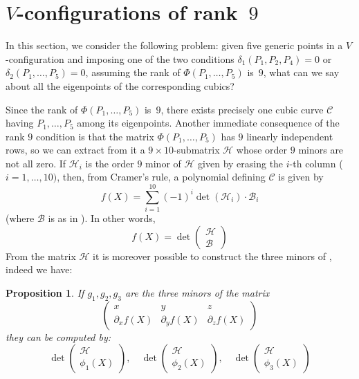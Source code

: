 \documentclass{amsart}
\theoremstyle{plain}
\newtheorem{prop}[lemma]{Proposition}
\theoremstyle{definition}
\newcommand{\de}{\partial}
\newcommand{\cbc}{\ensuremath{\mathcal{C}}}
\begin{document}
\section{$V$-configurations of rank~$9$}
\label{rank_9}

In this section, we consider the following problem:
given five generic points in a $V$-configuration and imposing one
of the two conditions
$\delta_1(P_1, P_2, P_4) = 0$ or $\delta_2(P_1, \dots, P_5) = 0$, assuming the rank of $\Phi(P_1, \dots, P_5)$ is~$9$, what can we say about all the eigenpoints of the corresponding cubics?

Since the rank of $\Phi(P_1, \dots, P_5)$ is~$9$, there exists precisely one cubic curve $\cbc$ having $P_1, \dots, P_5$ among its eigenpoints. Another immediate consequence of the rank $9$ condition is that the
matrix $\Phi(P_1, \dots, P_5)$ has $9$ linearly independent rows, so
we can extract from it a  $9 \times 10$-submatrix
$\mathcal{H}$ whose order $9$ minors are not all zero. If
$\mathcal{H}_i$ is the order $9$ minor of
$\mathcal{H}$ given by erasing the $i$-th column ($i=1, \dots, 10)$, then,
from Cramer's rule, a polynomial defining $\cbc$ is given by
\[
 f(X) = \sum_{i=1}^{10}(-1)^i\det(\mathcal{H}_i)\cdot \mathcal{B}_i
\]
(where $\mathcal{B}$ is as in ). In other words,
\[
f(X) = \det \left( \begin{array}{c} \mathcal{H}\\ \mathcal{B}
 \end{array} \right)
\]
From the matrix $\mathcal{H}$ it is moreover possible to construct
the three minors of , indeed we have:
\begin{prop}
\label{proposition:geiser1}
If $g_1, g_2, g_3$ are the three minors of the matrix
\[
\left(
\begin{array}{ccc}
x & y & z \\
\de_x f(X) & \de_y f(X) & \de_z f(X)
\end{array}
\right)
\]
they can be computed by:
\[
\det \left( \begin{array}{c} \mathcal{H}\\
\phi_1(X)
\end{array} \right),\quad
\det \left( \begin{array}{c} \mathcal{H}\\
\phi_2(X)
\end{array} \right), \quad
\det \left( \begin{array}{c} \mathcal{H}\\
\phi_3(X)
\end{array} \right)
\]
\end{prop}
\end{document}
